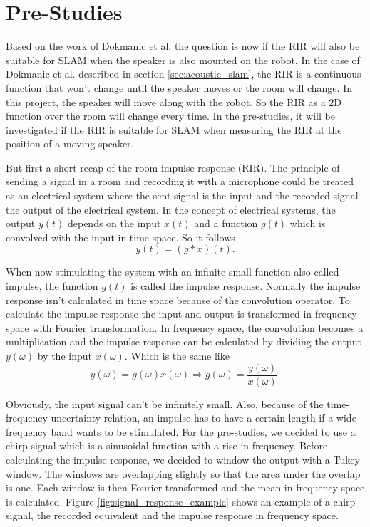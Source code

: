 \section{Pre-Studies}
\label{chap:pre_studies}

Based on the work of Dokmanic et al. \cite{dokmanic_roomrecslam_2016} the question is now if the RIR will also be suitable for SLAM when the speaker is also mounted on the robot. In the case of Dokmanic et al. \cite{dokmanic_roomrecslam_2016} described in section \ref{sec:acoustic_slam}, the RIR is a continuous function that won't change until the speaker moves or the room will change. In this project, the speaker will move along with the robot. So the RIR as a 2D function over the room will change every time. In the pre-studies, it will be investigated if the RIR is suitable for SLAM when measuring the RIR at the position of a moving speaker.

But first a short recap of the room impulse response (RIR). The principle of sending a signal in a room and recording it with a microphone could be treated as an electrical system where the sent signal is the input and the recorded signal the output of the electrical system. In the concept of electrical systems, the output $y(t)$ depends on the input $x(t)$ and a function $g(t)$ which is convolved with the input in time space. So it follows
$$
y(t) = (g * x)(t) \text{.}
$$

When now stimulating the system with an infinite small function also called impulse, the function $g(t)$ is called the impulse response. Normally the impulse response isn't calculated in time space because of the convolution operator. To calculate the impulse response the input and output is transformed in frequency space with Fourier transformation. In frequency space, the convolution becomes a multiplication and the impulse response can be calculated by dividing the output $y(\omega)$ by the input $x(\omega)$. Which is the same like
$$
y(\omega) = g(\omega) x(\omega) \Rightarrow g(\omega) = \frac{y(\omega)}{x(\omega)}\text{.}
$$

Obviously, the input signal can't be infinitely small. Also, because of the time-frequency uncertainty relation, an impulse has to have a certain length if a wide frequency band wants to be stimulated. For the pre-studies, we decided to use a chirp signal which is a sinusoidal function with a rise in frequency. Before calculating the impulse response, we decided to window the output with a Tukey window. The windows are overlapping slightly so that the area under the overlap is one. Each window is then Fourier transformed and the mean in frequency space is calculated. Figure \ref{fig:signal_response_example} shows an example of a chirp signal, the recorded equivalent and the impulse response in frequency space.

